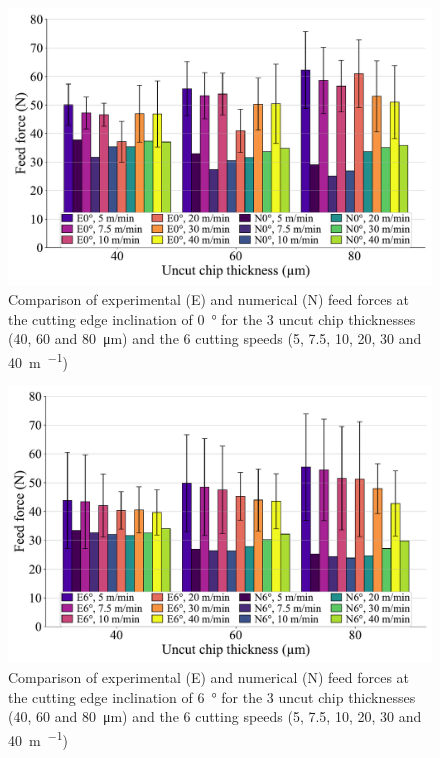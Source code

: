 \documentclass[preprint,12pt,times]{elsarticle}
\begin{document}
\begin{figure}[!h]
\centering
\includegraphics[width = 140 mm]{Figures/Fy_0}
\caption{Comparison of experimental (E) and numerical (N) feed forces at the cutting edge inclination of \qty{0}{\degree} for the 3 uncut chip thicknesses (40, 60 and \qty{80}{\um}) and the 6 cutting speeds (5, 7.5, 10, 20, 30 and \qty{40}{\m\per\min})}
\label{fig:Fy_0}
\end{figure}

\begin{figure}[!h]
\centering
\includegraphics[width = 140 mm]{Figures/Fy_6}
\caption{Comparison of experimental (E) and numerical (N) feed forces at the cutting edge inclination of \qty{6}{\degree} for the 3 uncut chip thicknesses (40, 60 and \qty{80}{\um}) and the 6 cutting speeds (5, 7.5, 10, 20, 30 and \qty{40}{\m\per\min})}
\label{fig:Fy_6}
\end{figure}
\end{document}
